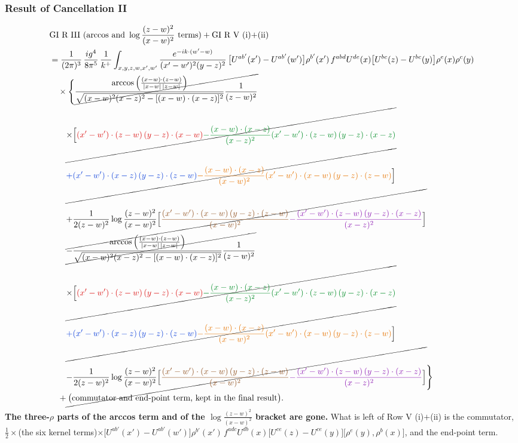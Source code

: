 \documentclass[9pt]{article}
\newcommand{\R}[1]{{\color{cR}#1}}
\newcommand{\B}[1]{{\color{cB}#1}}
\newcommand{\G}[1]{{\color{cG}#1}}
\newcommand{\Or}[1]{{\color{cO}#1}}
\newcommand{\Vi}[1]{{\color{cV}#1}}
\newcommand{\Br}[1]{{\color{cN}#1}}
\newcommand{\Gr}[1]{{\color{cX}#1}}
\numberwithin{equation}{section}
\begin{document}
\subsubsection*{Result of Cancellation II}
\begin{align}
&\text{GI R III (arccos and }\log\frac{(z-w)^{2}}{(x-w)^{2}}\text{ terms)}+\text{GI R V (i)+(ii)}\notag\\
&=\frac{1}{(2\pi)^{3}}\,\frac{ig^{4}}{8\pi^{5}}\,\frac{1}{k^{+}}\int_{x,y,z,w,x',w'}\frac{e^{-ik\cdot(w'-w)}}{(x'-w')^{2}(y-z)^{2}}\,\big[U^{ab'}(x')-U^{ab'}(w')\big]\rho^{b'}(x')\,f^{abd}U^{de}(x)\big[U^{bc}(z)-U^{bc}(y)\big]\rho^{e}(x)\rho^{c}(y)\notag\\
&\quad\times\Bigg\{\cancel{\frac{\arccos\Big(\frac{(x-w)\cdot(z-w)}{|x-w|\,|z-w|}\Big)}{\sqrt{(x-w)^{2}(x-z)^{2}-[(x-w)\cdot(x-z)]^{2}}}\frac{1}{(z-w)^{2}}}\notag\\
&\qquad\cancel{\times\Big[\R{(x'-w')\cdot(z-w)\,(y-z)\cdot(x-w)}\G{-\frac{(x-w)\cdot(x-z)}{(x-z)^{2}}(x'-w')\cdot(z-w)\,(y-z)\cdot(x-z)}\Big.}\notag\\
&\qquad\cancel{\Big.\B{+(x'-w')\cdot(x-z)\,(y-z)\cdot(z-w)}\Or{-\frac{(x-w)\cdot(x-z)}{(x-w)^{2}}(x'-w')\cdot(x-w)\,(y-z)\cdot(z-w)}\Big]}\notag\\
&\qquad\cancel{+\frac{1}{2(z-w)^{2}}\log\frac{(z-w)^{2}}{(x-w)^{2}}\Big[\Br{\frac{(x'-w')\cdot(x-w)\,(y-z)\cdot(z-w)}{(x-w)^{2}}}\Vi{-\frac{(x'-w')\cdot(z-w)\,(y-z)\cdot(x-z)}{(x-z)^{2}}}\Big]}\notag\\
&\qquad\cancel{-\frac{\arccos\Big(\frac{(x-w)\cdot(z-w)}{|x-w|\,|z-w|}\Big)}{\sqrt{(x-w)^{2}(x-z)^{2}-[(x-w)\cdot(x-z)]^{2}}}\frac{1}{(z-w)^{2}}}\notag\\
&\qquad\cancel{\times\Big[\R{(x'-w')\cdot(z-w)\,(y-z)\cdot(x-w)}\G{-\frac{(x-w)\cdot(x-z)}{(x-z)^{2}}(x'-w')\cdot(z-w)\,(y-z)\cdot(x-z)}\Big.}\notag\\
&\qquad\cancel{\Big.\B{+(x'-w')\cdot(x-z)\,(y-z)\cdot(z-w)}\Or{-\frac{(x-w)\cdot(x-z)}{(x-w)^{2}}(x'-w')\cdot(x-w)\,(y-z)\cdot(z-w)}\Big]}\notag\\
&\qquad\cancel{-\frac{1}{2(z-w)^{2}}\log\frac{(z-w)^{2}}{(x-w)^{2}}\Big[\Br{\frac{(x'-w')\cdot(x-w)\,(y-z)\cdot(z-w)}{(x-w)^{2}}}\Vi{-\frac{(x'-w')\cdot(z-w)\,(y-z)\cdot(x-z)}{(x-z)^{2}}}\Big]}\Bigg\}\notag\\
&\quad+\big(\text{commutator and end-point term, kept in the final result}\big).
\end{align}
\textbf{The three-$\rho$ parts of the arccos term and of the $\log\frac{(z-w)^{2}}{(x-w)^{2}}$ bracket are gone.} What is left of Row V (i)$+$(ii) is the \Gr{commutator}, $\frac12\times$(the six kernel terms)$\times\big[U^{ab'}(x')-U^{ab'}(w')\big]\rho^{b'}(x')\,f^{adc}U^{db}(x)\big[U^{ce}(z)-U^{ce}(y)\big]\big[\rho^{e}(y),\rho^{b}(x)\big]$, and the end-point term.
\end{document}

